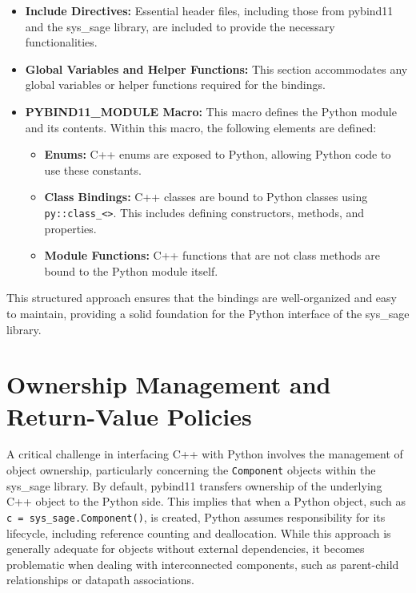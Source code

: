 \begin{itemize}
    \item   \textbf{Include Directives:} Essential header files, including those from pybind11 and the sys\_sage library, are included to provide the necessary functionalities.
    \item   \textbf{Global Variables and Helper Functions:} This section accommodates any global variables or helper functions required for the bindings.
    \item   \textbf{PYBIND11\_MODULE Macro:} This macro defines the Python module and its contents. Within this macro, the following elements are defined:
        \begin{itemize}
            \item   \textbf{Enums:} C++ enums are exposed to Python, allowing Python code to use these constants.
            \item   \textbf{Class Bindings:} C++ classes are bound to Python classes using \verb|py::class_<>|. This includes defining constructors, methods, and properties.
            \item   \textbf{Module Functions:} C++ functions that are not class methods are bound to the Python module itself.
        \end{itemize}
\end{itemize}

This structured approach ensures that the bindings are well-organized and easy to maintain, providing a solid foundation for the Python interface of the sys\_sage library.

\section{Ownership Management and Return-Value Policies}

A critical challenge in interfacing C++ with Python involves the management of object ownership, particularly concerning the \verb|Component| objects within the sys\_sage library. By default, pybind11 transfers ownership of the underlying C++ object to the Python side. This implies that when a Python object, such as \verb|c = sys_sage.Component()|, is created, Python assumes responsibility for its lifecycle, including reference counting and deallocation. While this approach is generally adequate for objects without external dependencies, it becomes problematic when dealing with interconnected components, such as parent-child relationships or datapath associations.

